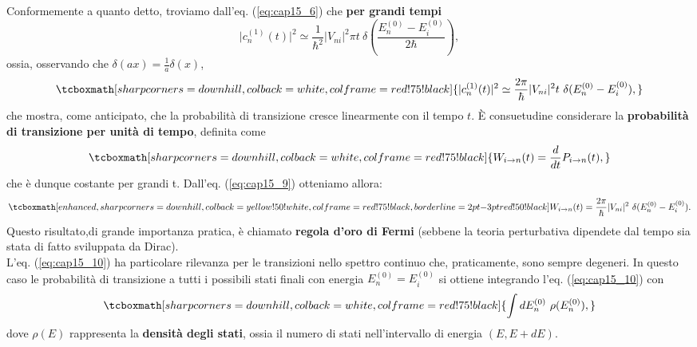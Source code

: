 \documentclass[a4paper,12pt,oneside]{book}
\begin{document}
Conformemente a quanto detto, troviamo dall'eq. (\ref{eq:cap15_6}) che \textbf{per grandi tempi}
	\begin{equation}
		\vert c_n ^{(1)} (t) \vert ^2 \simeq \frac{1}{\hbar ^2} \vert V_{ni} \vert ^2 \pi t\ \delta\left(\frac{E_n ^{(0)}-E_i ^{(0)}}{2\hbar} \right),
	\end{equation}
ossia, osservando che $\delta (ax) = \frac{1}{a} \delta (x)$,
	\begin{equation}
		\tcboxmath[sharp corners=downhill, colback=white, colframe=red!75!black]{
			\vert c_n ^{(1)} (t) \vert ^2 \simeq \frac{2\pi}{\hbar } \vert V_{ni} \vert ^2  t\ \delta (E_n ^{(0)}-E_i ^{(0)} ),
			}
	\label{eq:cap15_9}
	\end{equation}
che mostra, come anticipato, che la probabilità di transizione cresce linearmente con il tempo $t$. È consuetudine considerare la \textbf{probabilità di transizione per unità di tempo}, definita come
	\begin{equation}
		\tcboxmath[sharp corners=downhill, colback=white, colframe=red!75!black]{
			W_{i\rightarrow n} (t) =\frac{d}{dt} P_{i\rightarrow n} (t),
			}
	\end{equation}
che è dunque costante per grandi t. Dall'eq. (\ref{eq:cap15_9}) otteniamo allora:
	\begin{equation}
		\tcboxmath[enhanced, sharp corners=downhill, colback=yellow!50!white, colframe=red!75!black, borderline={2pt}{-3pt}{red!50!black}]{
			W_{i\rightarrow n} (t) = \frac{2\pi}{\hbar } \vert V_{ni} \vert ^2\ \delta (E_n ^{(0)}-E_i ^{(0)} ).
			}
	\label{eq:cap15_10}
	\end{equation}
Questo risultato,di grande importanza pratica, è chiamato \textbf{regola d'oro di Fermi} (sebbene la teoria perturbativa dipendete dal tempo sia stata di fatto sviluppata da Dirac).\\
		
L'eq. (\ref{eq:cap15_10}) ha particolare rilevanza per le transizioni nello spettro continuo che, praticamente, sono sempre degeneri. In questo caso le probabilità di transizione a tutti i possibili stati finali con energia $E_n ^{(0)}= E_i ^{(0)}$ si ottiene integrando l'eq. (\ref{eq:cap15_10}) con
	\begin{equation}
		\tcboxmath[sharp corners=downhill, colback=white, colframe=red!75!black]{
			\int dE_n ^{(0)} \ \rho (E_n ^{(0)}),
			}
	\end{equation}
dove $\rho (E)$ rappresenta la \textbf{densità degli stati}, ossia il numero di stati nell'intervallo di energia $(E, E+dE)$.
\end{document}
